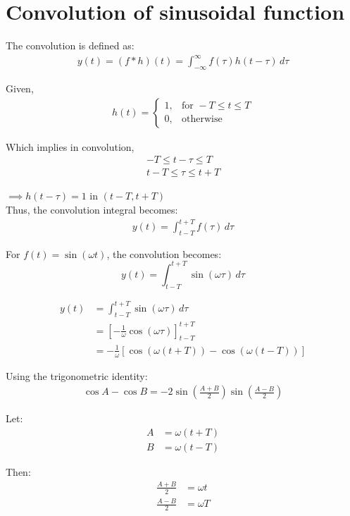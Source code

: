 \section{Convolution of sinusoidal function}
The convolution is defined as:
\begin{align*}
y(t) = (f * h)(t) = \int_{-\infty}^{\infty} f(\tau) h(t - \tau) \, d\tau
\end{align*}

Given,
\begin{align*}
h(t)=
\begin{cases}
    1, & \text{for } -T \leq t \leq T \\
    0, & \text{otherwise}
\end{cases}
\end{align*}

Which implies in convolution,
\begin{align*}
    -T \leq t - \tau \leq T \\
    t-T \leq \tau \leq t+T
\end{align*}

$\implies h(t-\tau)=1$ in $(t-T,t+T)$
\\
Thus, the convolution integral becomes:
\begin{align*}
y(t) = \int_{t - T}^{t + T} f(\tau) \, d\tau
\end{align*}

For $f(t) = \sin(\omega t)$, the convolution becomes:
\[
y(t) = \int_{t - T}^{t + T} \sin(\omega \tau) \, d\tau
\]

\begin{align*}
y(t) &= \int_{t - T}^{t + T} \sin(\omega \tau) \, d\tau \\
&= \left[ -\frac{1}{\omega} \cos(\omega \tau) \right]_{t - T}^{t + T} \\
&= -\frac{1}{\omega} \left[ \cos(\omega (t + T)) - \cos(\omega (t - T)) \right]
\end{align*}

Using the trigonometric identity:
\begin{align*}
\cos A - \cos B = -2 \sin\left(\frac{A + B}{2}\right) \sin\left(\frac{A - B}{2}\right) \end{align*}

Let:
\begin{align*}
A &= \omega (t + T) \\
B &= \omega (t - T)
\end{align*}

Then:
\begin{align*}
\frac{A + B}{2} &= \omega t \\
\frac{A - B}{2} &= \omega T
\end{align*}

